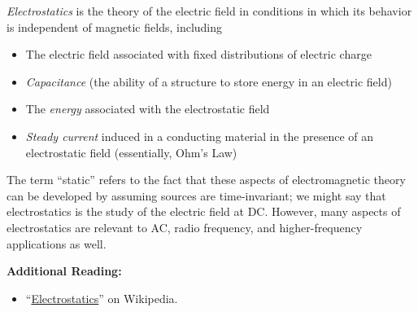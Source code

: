 

\label{m0116_Electrostatics_Preface} %

\emph{Electrostatics} is the theory of the electric field in conditions in which its behavior is independent of magnetic fields, including
%
\begin{itemize}
\item The electric field associated with fixed distributions of electric charge
\item \emph{Capacitance} (the ability of a structure to store energy in an electric field)
\item The \emph{energy} associated with the electrostatic field
\item \emph{Steady current} induced in a conducting material in the presence of an electrostatic field (essentially, Ohm's Law)
\end{itemize}
%
The term ``static'' refers to the fact that these aspects of electromagnetic theory can be developed by assuming sources are time-invariant; we might say that electrostatics is the study of the electric field at DC.  However, many aspects of electrostatics are relevant to AC, radio frequency, and higher-frequency applications as well.
 

{\bf Additional Reading:}
\begin{itemize}
\item ``\href{https://en.wikipedia.org/wiki/Electrostatics}{Electrostatics}'' on Wikipedia.
\end{itemize}



\vspace{1in}
